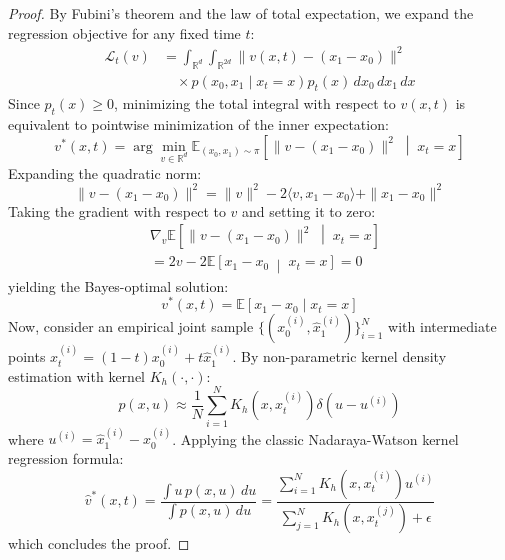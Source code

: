 \documentclass[10pt,journal,compsoc]{IEEEtran}
\begin{document}
\begin{proof}
By Fubini's theorem and the law of total expectation, we expand the regression objective for any fixed time $t$:
\begin{align}
\mathcal{L}_t(v) &= \int_{\mathbb{R}^d} \int_{\mathbb{R}^{2d}} \|v(x, t) - (x_1 - x_0)\|^2 \nonumber \\
&\quad \times p(x_0, x_1 \mid x_t = x) p_t(x) \, dx_0 \, dx_1 \, dx
\end{align}
Since $p_t(x) \ge 0$, minimizing the total integral with respect to $v(x, t)$ is equivalent to pointwise minimization of the inner expectation:
\begin{equation}
v^*(x, t) = \arg\min_{v \in \mathbb{R}^d} \mathbb{E}_{(x_0, x_1) \sim \pi} \left[ \|v - (x_1 - x_0)\|^2 \;\middle|\; x_t = x \right]
\end{equation}
Expanding the quadratic norm:
\begin{equation}
\|v - (x_1 - x_0)\|^2 = \|v\|^2 - 2 \langle v, x_1 - x_0 \rangle + \|x_1 - x_0\|^2
\end{equation}
Taking the gradient with respect to $v$ and setting it to zero:
\begin{align}
&\nabla_v \mathbb{E} \left[ \|v - (x_1 - x_0)\|^2 \;\middle|\; x_t = x \right] \nonumber \\
&= 2 v - 2 \mathbb{E} \left[ x_1 - x_0 \;\middle|\; x_t = x \right] = 0
\end{align}
yielding the Bayes-optimal solution:
\begin{equation}
v^*(x, t) = \mathbb{E}[x_1 - x_0 \mid x_t = x]
\end{equation}
Now, consider an empirical joint sample $\{(x_0^{(i)}, \hat{x}_1^{(i)})\}_{i=1}^N$ with intermediate points $x_t^{(i)} = (1 - t)x_0^{(i)} + t \hat{x}_1^{(i)}$. By non-parametric kernel density estimation with kernel $K_h(\cdot, \cdot)$:
\begin{equation}
p(x, u) \approx \frac{1}{N} \sum_{i=1}^N K_h(x, x_t^{(i)}) \delta(u - u^{(i)})
\end{equation}
where $u^{(i)} = \hat{x}_1^{(i)} - x_0^{(i)}$. Applying the classic Nadaraya-Watson kernel regression formula:
\begin{equation}
\hat{v}^*(x, t) = \frac{\int u \, p(x, u) \, du}{\int p(x, u) \, du} = \frac{\sum_{i=1}^N K_h(x, x_t^{(i)}) u^{(i)}}{\sum_{j=1}^N K_h(x, x_t^{(j)}) + \epsilon}
\end{equation}
which concludes the proof.
\end{proof}
\end{document}
